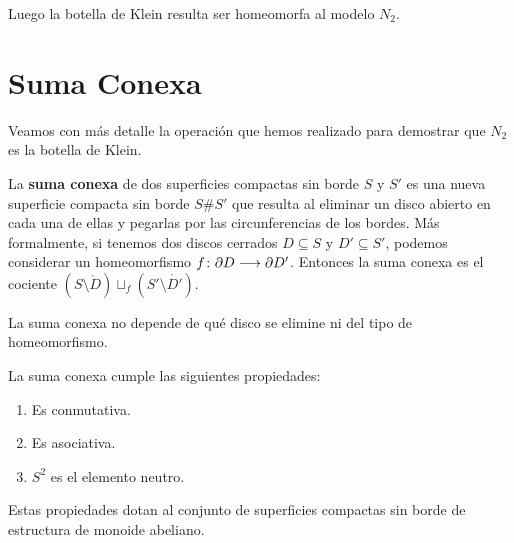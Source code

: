 \documentclass[GTS.tex]{subfiles}
\begin{document}
\begin{observacion}[Importante]

Luego la botella de Klein resulta ser homeomorfa al modelo $N_2$.
\end{observacion}

\section{Suma Conexa}

Veamos con más detalle la operación que hemos realizado para demostrar que $N_2$ es la botella de Klein.

\begin{defi}
La \textbf{suma conexa} de dos superficies compactas sin borde $S$ y $S'$ es una nueva superficie compacta sin borde $S\# S'$ que resulta al eliminar un disco abierto en cada una de ellas y pegarlas por las circunferencias de los bordes. Más formalmente, si tenemos dos discos cerrados $D\subseteq S$ y $D'\subseteq S'$, podemos considerar un homeomorfismo $f\colon{\partial D}\longrightarrow{\partial D'}$. Entonces la suma conexa es el cociente $(S\setminus \mathring{D})\sqcup_f(S'\setminus \mathring{D'})$.
\end{defi}

\begin{nota} La suma conexa no depende de qué disco se elimine ni del tipo de homeomorfismo.
\end{nota}

\begin{propi} La suma conexa cumple las siguientes propiedades:
\begin{enumerate}
\item Es conmutativa.
\item Es asociativa.
\item $S^2$ es el elemento neutro.
\end{enumerate}
Estas propiedades dotan al conjunto de superficies compactas sin borde de estructura de monoide abeliano.
\end{propi}
\end{document}
